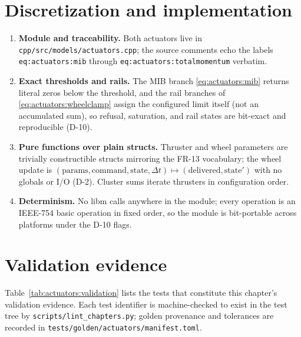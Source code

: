 \section{Discretization and implementation}
\label{sec:actuators:implementation}

\begin{enumerate}
  \item \textbf{Module and traceability.} Both actuators live in
    \texttt{cpp/src/models/actuators.cpp}; the source comments echo the
    labels \texttt{eq:actuators:mib} through
    \texttt{eq:actuators:totalmomentum} verbatim.
  \item \textbf{Exact thresholds and rails.} The MIB branch
    \eqref{eq:actuators:mib} returns literal zeros below the threshold,
    and the rail branches of \eqref{eq:actuators:wheelclamp} assign the
    configured limit itself (not an accumulated sum), so refusal,
    saturation, and rail states are bit-exact and reproducible (D-10).
  \item \textbf{Pure functions over plain structs.} Thruster and wheel
    parameters are trivially constructible structs mirroring the FR-13
    vocabulary; the wheel update is
    $(\text{params}, \text{command}, \text{state}, \Delta t) \mapsto
    (\text{delivered}, \text{state}')$ with no globals or I/O (D-2).
    Cluster sums iterate thrusters in configuration order.
  \item \textbf{Determinism.} No libm calls anywhere in the module;
    every operation is an IEEE-754 basic operation in fixed order, so
    the module is bit-portable across platforms under the D-10 flags.
\end{enumerate}

\section{Validation evidence}
\label{sec:actuators:validation}

Table~\ref{tab:actuators:validation} lists the tests that constitute
this chapter's validation evidence. Each test identifier is
machine-checked to exist in the test tree by
\texttt{scripts/lint\_chapters.py}; golden provenance and tolerances
are recorded in \texttt{tests/golden/actuators/manifest.toml}.

